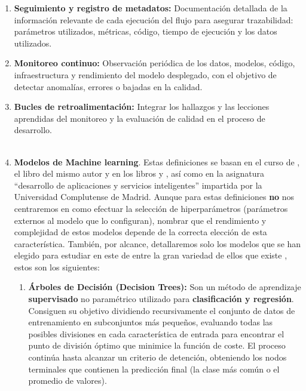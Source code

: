 \begin{enumerate}
\begin{enumerate}
		\item \textbf{Seguimiento y registro de metadatos:} Documentación detallada de la información relevante de cada ejecución del flujo para asegurar trazabilidad: parámetros utilizados, métricas, código, tiempo de ejecución y los datos utilizados.
		
		\item \textbf{Monitoreo continuo:} Observación periódica de los datos, modelos, código, infraestructura y rendimiento del modelo desplegado, con el objetivo de detectar anomalías, errores o bajadas en la calidad.
		
		\item \textbf{Bucles de retroalimentación:} Integrar los hallazgos y las lecciones aprendidas del monitoreo y la evaluación de calidad en el proceso de desarrollo.  \\ \\ 
		
		
	\item \textbf{Modelos de Machine learning}.  \label{def15} Estas definiciones se basan en el curso de \citep{JasonMachinelearningmastery}, el libro del mismo autor \citep{Brownlee_2016_MLAFS} y en los libros \citep{Fowdur2021} y \citep{Sarker2021}, así como en la asignatura ``desarrollo de aplicaciones y servicios inteligentes'' impartida por la Universidad Complutense de Madrid. Aunque para estas definiciones \textbf{no} nos centraremos en como efectuar la selección de hiperparámetros (parámetros externos al modelo que lo configuran), nombrar que el rendimiento y complejidad de estos modelos depende de la correcta elección de esta característica. También, por alcance, detallaremos solo los modelos que se han elegido para estudiar en este de entre la gran variedad de ellos que existe \citep{MachineLearningMethodsList}, estos son los siguientes:
	
	\begin{enumerate}
		\item \textbf{Árboles de Decisión (Decision Trees):}
		Son un método de aprendizaje \textbf{supervisado} no paramétrico utilizado para \textbf{clasificación y regresión}. Consiguen su objetivo dividiendo recursivamente el conjunto de datos de entrenamiento en subconjuntos más pequeños, evaluando todas las posibles divisiones en cada característica de entrada para encontrar el punto de división óptimo que minimice la función de coste. El proceso continúa hasta alcanzar un criterio de detención, obteniendo los nodos terminales que contienen la predicción final (la clase más común o el promedio de valores).
		

\end{enumerate}
\end{enumerate}
\end{enumerate}
